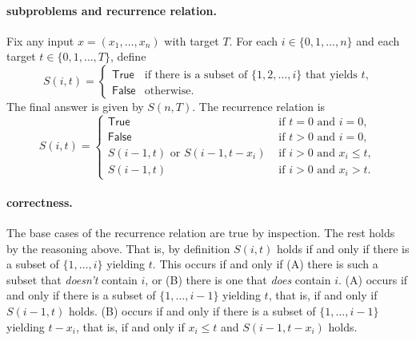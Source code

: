 \paragraph{subproblems and recurrence relation.}
Fix any input $x=(x_1,\ldots,x_n)$ with target $T$.
For each $i\in\{0,1,\ldots,n\}$ and each target $t\in\{0,1,\ldots,T\}$,
define
\[S(i, t) = \begin{cases}
    \textsf{True} & \text{if there is a subset of $\{1,2,\ldots,i\}$ that yields $t$,} \\
    \textsf{False} & \text{otherwise}.
  \end{cases}
\]
The final answer is given by $S(n, T)$.
The recurrence relation is
  \[
    S(i, t) =
    \begin{cases}
      \textsf{True} & \text{ if } t = 0 \text{ and } i=0, \\
      \textsf{False} & \text{ if } t > 0 \text{ and } i=0,\\
      S(i-1, t) \text{ or } S(i-1, t - x_i) & \text{ if } i > 0 \text{ and } x_i \le t, \\
      S(i-1, t) & \text{ if } i > 0 \text{ and } x_i > t.
    \end{cases}
  \]

\paragraph{correctness.} 
The base cases of the recurrence relation are true by inspection.
The rest holds by the reasoning above.
That is, by definition $S(i, t)$ holds if and only if there is a subset of $\{1,\ldots,i\}$ yielding $t$.
This occurs if and only if (A) there is such a subset that \emph{doesn't} contain $i$,
or (B) there is one that \emph{does} contain $i$.
(A) occurs if and only if there is a subset of $\{1,\ldots,i-1\}$ yielding $t$,
that is, if and only if $S(i-1, t)$ holds. 
(B) occurs if and only if there is a subset of $\{1,\ldots,i-1\}$ yielding $t-x_i$,
that is, if and only if $x_i \le t$ and $S(i-1, t-x_i)$ holds.
  
